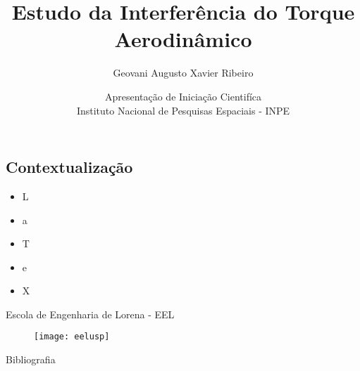 \documentclass{beamer}
\title[Torque Aerodinâmico]{\Huge{Estudo da Interferência do Torque Aerodinâmico}}
\author[Geovani] {Geovani Augusto Xavier Ribeiro \\
  \text{\scriptsize{geovani.augusto@usp.br}}}
\date[EEL-USP]{\scriptsize{Apresentação de Iniciação Cientifíca} \\ Instituto Nacional de Pesquisas Espaciais - INPE}
\begin{document}
  \begin{frame}
    \titlepage
  \end{frame}

\begin{frame}

  \section{Contextualização}
  \begin{tcolorbox}[colback=blue!5!white,colframe=blue!70!white,title=Introdução]
    \begin{itemize}

    \item[{\textcolor{blue!10!white}{\ding{101}}}] L
      \pause
    \item[{\textcolor{blue!30!white}{\ding{101}}}] a
      \pause
    \item[{\textcolor{blue!50!white}{\ding{101}}}] T
      \pause
    \item[{\textcolor{blue!70!white}{\ding{101}}}] e
      \pause
    \item[{\textcolor{blue!100!white}{\ding{101}}}] X
    \end{itemize}
  \end{tcolorbox}

\end{frame}

\begin{frame}
\begin{block}{Escola de Engenharia de Lorena - EEL}
\begin{figure}[!htb]
	\centering
	\texttt{[image: eelusp]} \\
	\cite{rosa2015estudo}
\end{figure}
\end{block}

\end{frame}

\begin{frame}{Bibliografia}


\end{frame}
\end{document}
